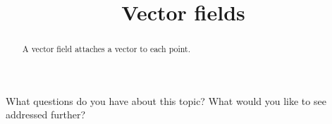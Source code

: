 \documentclass{ximera}
\title{Vector fields}
\begin{document}
\begin{abstract}
  A vector field attaches a vector to each point.
\end{abstract}

\maketitle



What questions do you have about this topic?  What would you like to see addressed further?
\begin{free-response}
\end{free-response}
\end{document}
